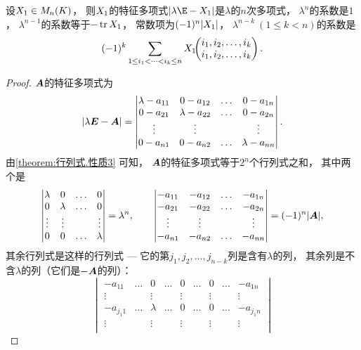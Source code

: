 \begin{proposition}
设\(X_1 \in M_n(K)\)，
则\(X_1\)的特征多项式\(\abs{\lambda\E-\A}\)是\(\lambda\)的\(n\)次多项式，
\(\lambda^n\)的系数是\(1\)，
\(\lambda^{n-1}\)的系数等于\(-\tr X_1\)，
常数项为\((-1)^n \abs{X_1}\)，
\(\lambda^{n-k}\ (1\leq k<n)\)的系数是\[
	(-1)^k \sum_{1 \leq i_1 < \dotsb < i_k \leq n} X_1\kern-3.8pt\begin{pmatrix}
		i_1,i_2,\dotsc,i_k \\
		i_1,i_2,\dotsc,i_k
	\end{pmatrix}.
\]
\begin{proof}
\(\boldsymbol{A}\)的特征多项式为\[
	\abs{\lambda\boldsymbol{E}-\boldsymbol{A}}
	= \begin{vmatrix}
		\lambda-a_{11} & 0-a_{12} & \dots & 0-a_{1n} \\
		0-a_{21} & \lambda-a_{22} & \dots & 0-a_{2n} \\
		\vdots & \vdots && \vdots \\
		0-a_{n1} & 0-a_{n2} & \dots & \lambda-a_{nn}
	\end{vmatrix}.
\]
由\cref{theorem:行列式.性质3} 可知，
\(\boldsymbol{A}\)的特征多项式等于\(2^n\)个行列式之和，
其中两个是\[
	\begin{vmatrix}
		\lambda & 0 & \dots & 0 \\
		0 & \lambda & \dots & 0 \\
		\vdots & \vdots && \vdots \\
		0 & 0 & \dots & \lambda
	\end{vmatrix}
	= \lambda^n,
	\qquad
	\begin{vmatrix}
		-a_{11} & -a_{12} & \dots & -a_{1n} \\
		-a_{21} & -a_{22} & \dots & -a_{2n} \\
		\vdots & \vdots && \vdots \\
		-a_{n1} & -a_{n2} & \dots & -a_{nn}
	\end{vmatrix}
	= (-1)^n \abs{\boldsymbol{A}},
\]
其余行列式是这样的行列式 --- 它的第\(j_1,j_2,\dotsc,j_{n-k}\)列是含有\(\lambda\)的列，
其余列是不含\(\lambda\)的列（它们是\(-\boldsymbol{A}\)的列）：\begin{equation*}
	\begin{vmatrix}
		-a_{11} & \dots & 0 & \dots & 0 & \dots & 0 & \dots & -a_{1n} \\
		\vdots & & \vdots & & \vdots & & \vdots & & \vdots \\
		-a_{j_1 1} & \dots & \lambda & \dots & 0 & \dots & 0 & \dots & -a_{j_1 n} \\
		\vdots & & \vdots & & \vdots & & \vdots & & \vdots \\

\end{vmatrix}
\end{equation*}
\end{proof}
\end{proposition}
